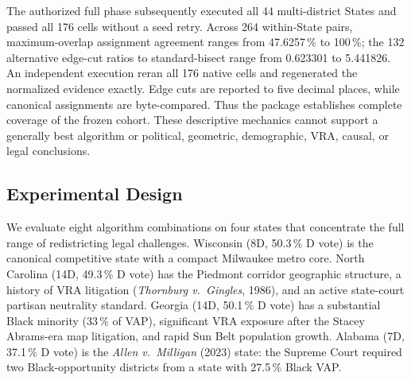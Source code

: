 The authorized full phase subsequently executed all 44 multi-district States
and passed all 176 cells without a seed retry. Across 264 within-State pairs,
maximum-overlap assignment agreement ranges from 47.6257\,\% to 100\,\%; the
132 alternative edge-cut ratios to standard-bisect range from 0.623301 to
5.441826. An independent execution reran all 176 native cells and regenerated
the normalized evidence exactly. Edge cuts are reported to five decimal places,
while canonical assignments are byte-compared. Thus the package establishes
complete coverage of the frozen cohort. These
descriptive mechanics cannot support a generally best algorithm or political,
geometric, demographic, VRA, causal, or legal conclusions.

\subsection{Experimental Design}

We evaluate eight algorithm combinations on four states that concentrate the
full range of redistricting legal challenges.
Wisconsin (8D, 50.3\,\% D vote) is the canonical competitive state with a
compact Milwaukee metro core.
North Carolina (14D, 49.3\,\% D vote) has the Piedmont corridor geographic
structure, a history of VRA litigation (\emph{Thornburg v.\ Gingles}, 1986),
and an active state-court partisan neutrality standard.
Georgia (14D, 50.1\,\% D vote) has a substantial Black minority (33\,\% of
VAP), significant VRA exposure after the Stacey Abrams-era map litigation,
and rapid Sun Belt population growth.
Alabama (7D, 37.1\,\% D vote) is the \emph{Allen v.\ Milligan} (2023) state:
the Supreme Court required two Black-opportunity districts from a state with
27.5\,\% Black VAP.


